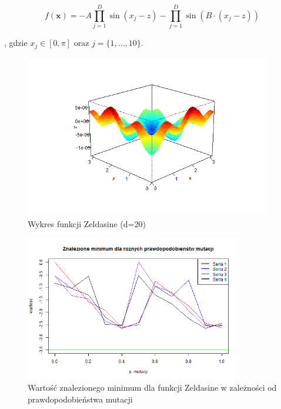 \documentclass[11pt, a4paper]{article}
\begin{document}
\begin{equation}\label{eq:zeldasine}
f(\boldsymbol{x}) = -A \prod_{j=1}^{D} \sin (x_j - z) - \prod_{j=1}^{D} \sin (B \cdot (x_j - z))
\end{equation}

, gdzie $ x_j \in [0, \pi]$ oraz $j = \{1, ..., 10\}$.

\begin{figure}[H]
	\begin{center}
		\includegraphics[width=0.95\textwidth]{./assets/Zeldasine201.png}
		\caption{Wykres funkcji Zeldasine (d=20)}
		\label{fig:zeldasine1}
	\end{center}
\end{figure}

\begin{figure}[H]
	\begin{center}
		\includegraphics[width=0.85\textwidth]{./assets/Zeldasine202.png}
		\caption{Wartość znalezionego minimum dla funkcji Zeldasine w zależności od prawdopodobieństwa mutacji}
		\label{fig:zeldasine2}
	\end{center}
\end{figure}
\end{document}
